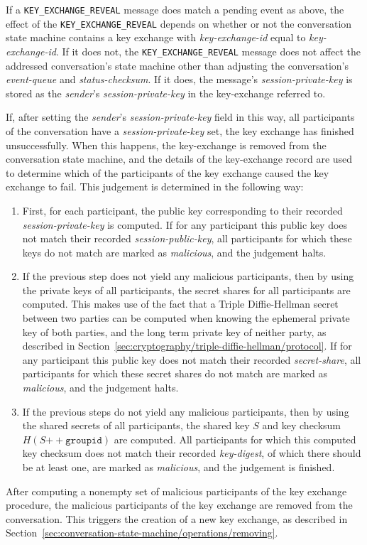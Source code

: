 \documentclass{article}
\def\message#1{\texttt{#1}}
\def\field#1{\textit{#1}}
\def\smfield#1{\textsl{#1}}
\def\type#1{\textsf{#1}}
\def\concat{\mathbin{+\!\!\!+}}
\begin{document}
If a \message{KEY\_EXCHANGE\_REVEAL} message does match a pending event as above, the effect of the \message{KEY\_EXCHANGE\_REVEAL} depends on whether or not the conversation state machine contains a key exchange with \smfield{key-exchange-id} equal to \field{key-exchange-id}.
If it does not, the \message{KEY\_EXCHANGE\_REVEAL} message does not affect the addressed conversation's state machine other than adjusting the conversation's \smfield{event-queue} and \smfield{status-checksum}.
If it does, the message's \field{session-private-key} is stored as the \field{sender}'s \smfield{session-private-key} in the \type{key-exchange} referred to.

If, after setting the \field{sender}'s \smfield{session-private-key} field in this way, all participants of the conversation have a \smfield{session-private-key} set, the key exchange has finished unsuccessfully.
When this happens, the \type{key-exchange} is removed from the conversation state machine, and the details of the \type{key-exchange} record are used to determine which of the participants of the key exchange caused the key exchange to fail.
This judgement is determined in the following way:
\begin{enumerate}
\item First, for each participant, the public key corresponding to their recorded \smfield{session-private-key} is computed. If for any participant this public key does not match their recorded \smfield{session-public-key}, all participants for which these keys do not match are marked as \emph{malicious}, and the judgement halts.
\item If the previous step does not yield any malicious participants, then by using the private keys of all participants, the secret shares for all participants are computed. This makes use of the fact that a Triple Diffie-Hellman secret between two parties can be computed when knowing the ephemeral private key of both parties, and the long term private key of neither party, as described in Section~\ref{sec:cryptography/triple-diffie-hellman/protocol}. If for any participant this public key does not match their recorded \smfield{secret-share}, all participants for which these secret shares do not match are marked as \emph{malicious}, and the judgement halts.
\item If the previous steps do not yield any malicious participants, then by using the shared secrets of all participants, the shared key $S$ and key checksum $H(S \concat \texttt{groupid})$ are computed. All participants for which this computed key checksum does not match their recorded \smfield{key-digest}, of which there should be at least one, are marked as \emph{malicious}, and the judgement is finished.
\end{enumerate}
After computing a nonempty set of malicious participants of the key exchange procedure, the malicious participants of the key exchange are removed from the conversation.
This triggers the creation of a new key exchange, as described in Section~\ref{sec:conversation-state-machine/operations/removing}.
\end{document}
